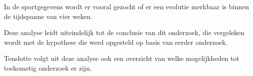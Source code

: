 In de sportgegevens wordt er vooral gezocht of er een evolutie merkbaar is binnen de tijdspanne van vier weken.

Deze analyse leidt uiteindelijk tot de conclusie van dit onderzoek, die vergeleken wordt met de hypothese die werd opgesteld op basis van eerder onderzoek.

Tenslotte volgt uit deze analyse ook een overzicht van welke mogelijkheden tot toekomstig onderzoek er zijn.





